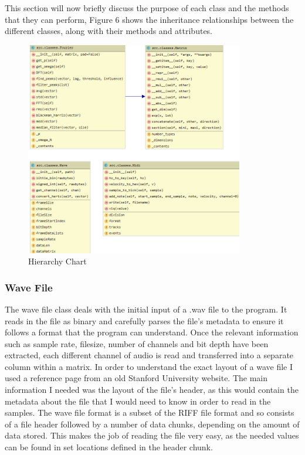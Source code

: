 \documentclass[12pt]{report}
\begin{document}
This section will now briefly discuss the purpose of each class and the methods that they can perform, Figure 6 shows the inheritance relationships between the different classes, along with their methods and attributes.

\begin{figure}[H]
	\centering
    \includegraphics[width=0.85\textwidth]{class_diagrams.PNG}
	\caption{Hierarchy Chart}
	\centering
\end{figure}

\subsubsection*{Wave File}
The wave file class deals with the initial input of a .wav file to the program. It reads in the file as binary and carefully parses the file's metadata to ensure it follows a format that the program can understand. Once the relevant information such as sample rate, filesize, number of channels and bit depth have been extracted, each different channel of audio is read and transferred into a separate column within a matrix. In order to understand the exact layout of a wave file I used a reference page \cite{Wave} from an old Stanford University website. The main information I needed was the layout of the file's header, as this would contain the metadata about the file that I would need to know in order to read in the samples. The wave file format is a subset of the RIFF file format and so consists of a file header followed by a number of data chunks, depending on the amount of data stored. This makes the job of reading the file very easy, as the needed values can be found in set locations defined in the header chunk.
\end{document}

